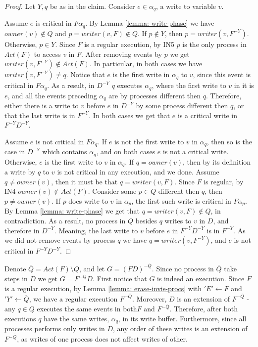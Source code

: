 \begin{proof}
	Let $Y,q$ be as in the claim. Consider $e \in \alpha_q$, a write to variable $v$. 
	
	Assume $e$ is critical in $F \alpha_q$. By Lemma \ref{lemma: write-phase} we have $owner(v) \notin Q$ and $p = writer(v,F) \notin Q$. If $p \notin Y$, then $p = writer(v,F^{-Y})$. Otherwise, $p \in Y$. Since $F$ is a regular execution, by IN5 $p$ is the only process in $Act(F)$ to access $v$ in $F$. After removing events by $p$ we get $writer(v,F^{-Y}) \notin Act(F)$. In particular, in both cases we have $writer(v,F^{-Y}) \neq q$.
	Notice that $e$ is the first write in $\alpha_q$ to $v$, since this event is critical in $F \alpha_q$. As a result, in $D^{-Y}$ $q$ executes $\alpha_q$, where the first write to $v$ in it is $e$, and all the events preceding $\alpha_q$ are by processes different then $q$. Therefore, either there is a write to $v$ before $e$ in $D^{-Y}$ by some process different then $q$, or that the last write is in $F^{-Y}$. In both cases we get that $e$ is a critical write in $F^{-Y} D^{-Y}$.
	
	Assume $e$ is not critical in $F \alpha_q$. If $e$ is not the first write to $v$ in $\alpha_q$, then so is the case in $D^{-Y}$ which contains $\alpha_q$, and on both cases $e$ is not a critical write. Otherwise, $e$ is the first write to $v$ in $\alpha_q$.
	If $q = owner(v)$, then by its definition a write by $q$ to $v$ is not critical in any execution, and we done. Assume $q \neq owner(v)$, then it must be that $q = writer(v,F)$. Since $F$ is regular, by IN4 $owner(v) \notin Act(F)$. Consider some $p \in Q$ different then $q$, then $p \neq owner(v)$. If $p$ does write to $v$ in $\alpha_p$, the first such write is critical in $F \alpha_p$. By Lemma \ref{lemma: write-phase} we get that $q=writer(v,F) \notin Q$, in contradiction. As a result, no process in $Q$ besides $q$ writes to $v$ in $D$, and therefore in $D^{-Y}$. Meaning, the last write to $v$ before $e$ in $F^{-Y} D^{-Y}$ is in $F^{-Y}$. As we did not remove events by process $q$ we have $q = writer(v,F^{-Y})$, and $e$ is not critical in $F^{-Y} D^{-Y}$.
\end{proof}

Denote $\overline{Q} = Act(F) \setminus Q$, and let $G = (F D)^{-\overline{Q}}$. Since no process in $\overline{Q}$ take steps in $D$ we get $G = F^{-\overline{Q}} D$.
First notice that $G$ is indeed an execution. Since $F$ is a regular execution, by Lemma \ref{lemma: erase-invis-procs} with $'E' \leftarrow F$ and $'Y' \leftarrow \overline{Q}$, we have a regular execution $F^{-\overline{Q}}$. Moreover, $D$ is an extension of $F^{-\overline{Q}}$ - any $q \in Q$ executes the same events in both$F$ and $F^{-\overline{Q}}$. Therefore, after both executions $q$ have the same writes, $\alpha_q$, in its write buffer. Furthermore, since all processes performs only writes in $D$, any order of these writes is an extension of $F^{-\overline{Q}}$, as writes of one process does not affect writes of other.

